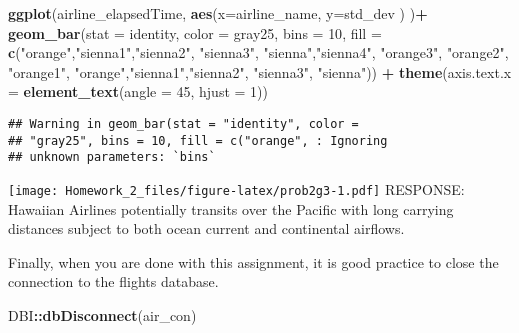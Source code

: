 \documentclass[
]{article}
\newenvironment{Shaded}{\begin{snugshade}}{\end{snugshade}}
\newcommand{\AttributeTok}[1]{\textcolor[rgb]{0.13,0.29,0.53}{#1}}
\newcommand{\DecValTok}[1]{\textcolor[rgb]{0.00,0.00,0.81}{#1}}
\newcommand{\FunctionTok}[1]{\textcolor[rgb]{0.13,0.29,0.53}{\textbf{#1}}}
\newcommand{\NormalTok}[1]{#1}
\newcommand{\SpecialCharTok}[1]{\textcolor[rgb]{0.81,0.36,0.00}{\textbf{#1}}}
\newcommand{\StringTok}[1]{\textcolor[rgb]{0.31,0.60,0.02}{#1}}
\begin{document}
\begin{Shaded}
\begin{Highlighting}[]
\FunctionTok{ggplot}\NormalTok{(airline\_elapsedTime, }\FunctionTok{aes}\NormalTok{(}\AttributeTok{x=}\NormalTok{airline\_name, }\AttributeTok{y=}\NormalTok{std\_dev ) )}\SpecialCharTok{+}
  \FunctionTok{geom\_bar}\NormalTok{(}\AttributeTok{stat =} \StringTok{\textquotesingle{}identity\textquotesingle{}}\NormalTok{, }\AttributeTok{color =} \StringTok{\textquotesingle{}gray25\textquotesingle{}}\NormalTok{, }\AttributeTok{bins =} \DecValTok{10}\NormalTok{, }
                 \AttributeTok{fill =} \FunctionTok{c}\NormalTok{(}\StringTok{"orange"}\NormalTok{,}\StringTok{"sienna1"}\NormalTok{,}\StringTok{"sienna2"}\NormalTok{,}
                          \StringTok{"sienna3"}\NormalTok{, }\StringTok{"sienna"}\NormalTok{,}\StringTok{"sienna4"}\NormalTok{, }
                          \StringTok{"orange3"}\NormalTok{, }\StringTok{"orange2"}\NormalTok{, }\StringTok{"orange1"}\NormalTok{, }
                          \StringTok{"orange"}\NormalTok{,}\StringTok{"sienna1"}\NormalTok{,}\StringTok{"sienna2"}\NormalTok{,}
                          \StringTok{"sienna3"}\NormalTok{, }\StringTok{"sienna"}\NormalTok{)) }\SpecialCharTok{+}
  \FunctionTok{theme}\NormalTok{(}\AttributeTok{axis.text.x =} \FunctionTok{element\_text}\NormalTok{(}\AttributeTok{angle =} \DecValTok{45}\NormalTok{, }\AttributeTok{hjust =} \DecValTok{1}\NormalTok{))}
\end{Highlighting}
\end{Shaded}

\begin{verbatim}
## Warning in geom_bar(stat = "identity", color =
## "gray25", bins = 10, fill = c("orange", : Ignoring
## unknown parameters: `bins`
\end{verbatim}

\texttt{[image: Homework\_2\_files/figure-latex/prob2g3-1.pdf]} RESPONSE:
Hawaiian Airlines potentially transits over the Pacific with long
carrying distances subject to both ocean current and continental
airflows.

Finally, when you are done with this assignment, it is good practice to
close the connection to the flights database.

\begin{Shaded}
\begin{Highlighting}[]
\NormalTok{DBI}\SpecialCharTok{::}\FunctionTok{dbDisconnect}\NormalTok{(air\_con)}
\end{Highlighting}
\end{Shaded}
\end{document}
